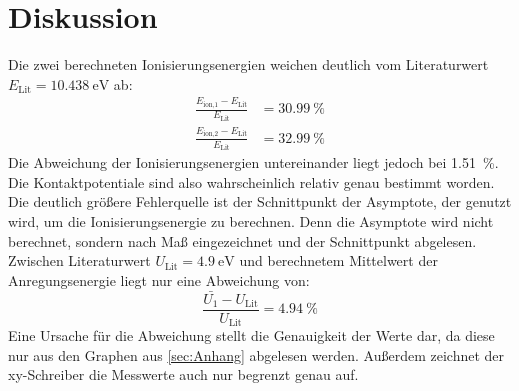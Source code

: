 \section{Diskussion}
\label{sec:Diskussion}

Die zwei berechneten Ionisierungsenergien weichen deutlich vom Literaturwert $E_\text{Lit} = \SI{10.438}{\eV}$ \cite{Ion} ab:
\begin{align*}
  \frac{E_\text{ion,1} - E_\text{Lit}}{E_\text{Lit}} &= \SI{30.99}{\percent} \\
  \frac{E_\text{ion,2} - E_\text{Lit}}{E_\text{Lit}} &= \SI{32.99}{\percent}
\end{align*}
Die Abweichung der Ionisierungsenergien untereinander liegt jedoch bei \SI{1.51}{\percent}.
Die Kontaktpotentiale sind also wahrscheinlich relativ genau bestimmt worden.
Die deutlich größere Fehlerquelle ist der Schnittpunkt der Asymptote, der genutzt wird, um die Ionisierungsenergie zu berechnen.
Denn die Asymptote wird nicht berechnet, sondern nach Maß eingezeichnet und der Schnittpunkt abgelesen.
Zwischen Literaturwert $U_\text{Lit} = \SI{4.9}{\eV}$ \cite{Queck} und berechnetem Mittelwert der Anregungsenergie liegt nur eine Abweichung von:
\begin{equation*}
  \frac{\bar{U_1} - U_\text{Lit}}{U_\text{Lit}} = \SI{4.94}{\percent}
\end{equation*}
Eine Ursache für die Abweichung stellt die Genauigkeit der Werte dar, da diese nur aus den Graphen aus \ref{sec:Anhang} abgelesen werden.
Außerdem zeichnet der xy-Schreiber die Messwerte auch nur begrenzt genau auf.
